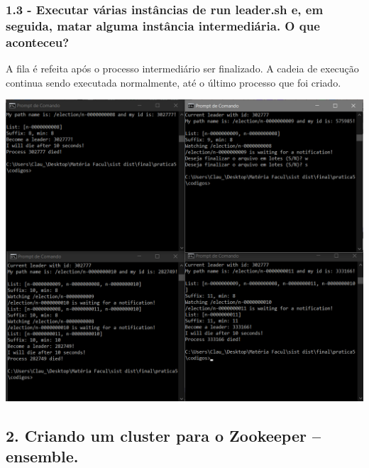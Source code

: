 \subsubsection{1.3 - Executar várias instâncias de run leader.sh e, em seguida, matar
alguma instância intermediária. O que aconteceu?}

A fila é refeita após o processo intermediário ser finalizado. A cadeia de execução continua sendo executada normalmente, até o último processo que foi criado. \newline

\includegraphics[width=20cm]{pratica5/prints/roteiro 1.3.PNG}


\subsection*{2. Criando um cluster para o Zookeeper – ensemble.}

